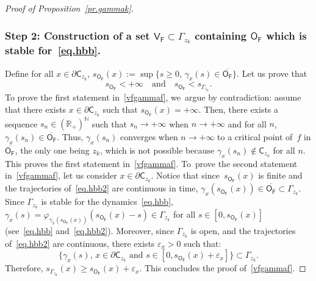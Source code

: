 \documentclass[10pt]{amsart}
\newcommand{\quand}{\quad\text{and}\quad}
\let\pa\partial
\let\ve\varepsilon
\theoremstyle{plain}
\theoremstyle{definition}
\begin{document}
\begin{proof}[Proof of Proposition~\ref{pr.gammak}]
\subsubsection*{Step 2: Construction of a set $\mathsf V_{\mathsf F}\subset \Gamma_{z_k}$ containing $\mathsf O_{\mathsf F}$ which is stable for~\eqref{eq.hbb}. }
Define for all $x\in \pa \mathsf C_{z_k}$, $ s_{\mathsf O_{\mathsf F}}(x):=\sup \{s\ge 0, \, \gamma_x(s) \in\overline{\mathsf O_{\mathsf F}}\}$. Let us prove that
\begin{equation}\label{vfgammaf}
s_{\mathsf O_{\mathsf F}} <+\infty \quand s_{\mathsf O_{\mathsf F}}< s_{\Gamma_{z_k}}.
\end{equation}
To prove the first statement in~\eqref{vfgammaf}, we~argue by contradiction:
assume that there exists $x\in \pa \mathsf C_{z_k}$ such that $s_{\mathsf O_{\mathsf F}}(x)=+\infty$. Then, there exists a sequence $s_n\in (\mathbb R_+)^{\mathbb N}$ such that $s_n\to +\infty$ when $n \to +\infty$ and for all $n$, $\gamma_x(s_n)\in \overline{\mathsf O_{\mathsf F}}$. Thus, $\gamma_x(s_n)$ converges when $n\to +\infty$ to a critical point of~$f$ in $\overline{\mathsf O_{\mathsf F}}$, the only one being $z_k$, which is not possible because $\gamma_x(s_n)\notin { \mathsf C_{z_k}}$ for all $n$.
This proves the first statement in~\eqref{vfgammaf}. To~prove the second statement in~\eqref{vfgammaf}, let us consider $x\in \pa \mathsf C_{z_k}$. Notice that since~$s_{\mathsf O_{\mathsf F}}(x)$ is finite and the trajectories of~\eqref{eq.hbb2} are continuous in time, $\gamma_x(s_{\mathsf O_{\mathsf F}}(x)) \in
\overline{\mathsf O_{\mathsf F}} \subset \Gamma_{z_k}$. Since $\Gamma_{z_k}$ is stable for the dynamics~\eqref{eq.hbb}, \hbox{$\gamma_x(s)=\varphi_{\gamma_x(s_{\mathsf O_{\mathsf F}}(x))} (s_{\mathsf O_{\mathsf F}}(x)-s) \in \Gamma_{z_k}$} for all $s\in [0,s_{\mathsf O_{\mathsf F}}(x)]$ (see~\eqref{eq.hbb} and~\eqref{eq.hbb2}).
Moreover, since $\Gamma_{z_k}$ is open, and the trajectories of~\eqref{eq.hbb2} are continuous, there exists $\ve_x>0$ such that:
\begin{equation}\label{inclutube}
\big \{ \gamma_x(s), \, x\in \pa \mathsf C_{z_k} \text{ and } s\in [0,s_{\mathsf O_{\mathsf F}}(x)+\ve_x]\big \} \subset \Gamma_{z_k}.
\end{equation}
Therefore, $ s_{\Gamma_{z_k}}(x)\ge s_{\mathsf O_{\mathsf
F}}(x)+\ve_x$. This concludes the proof of~\eqref{vfgammaf}.


\end{proof}
\end{document}

